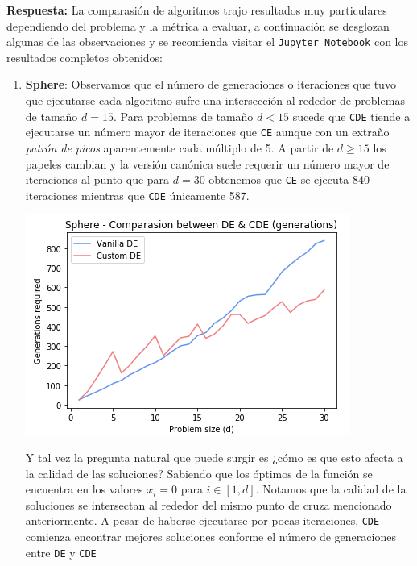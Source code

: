 \documentclass[10pt, letterpaper]{article}
\theoremstyle{definition}
\begin{document}
\begin{enumerate}
    \textbf{Respuesta:} La comparasión de algoritmos trajo resultados
    muy particulares dependiendo del problema y la métrica a evaluar, a
    continuación se desglozan algunas de las observaciones y se recomienda
    visitar el \texttt{Jupyter Notebook} con los resultados completos obtenidos:
    \begin{enumerate}
        \item \textbf{Sphere}: Observamos que el número de generaciones
               o iteraciones que tuvo que ejecutarse cada algoritmo sufre una
               intersección al rededor de problemas de tamaño $d=15$. Para
               problemas de tamaño $d<15$ sucede que \texttt{CDE} tiende a
               ejecutarse un número mayor de iteraciones que \texttt{CE} aunque
               con un extraño \textit{patrón de picos} aparentemente cada
               múltiplo de 5. A partir de $d\geq 15$ los papeles cambian y la
               versión canónica suele requerir un número mayor de iteraciones al
               punto que para $d=30$ obtenemos que \texttt{CE} se ejecuta 840
               iteraciones mientras que \texttt{CDE} únicamente 587.
            \begin{center}
                \includegraphics[scale=0.6]{assets/sphere-gens.png}
            \end{center}
            Y tal vez la pregunta natural que puede surgir es ¿cómo es que esto
            afecta a la calidad de las soluciones? Sabiendo que los óptimos
            de la función se encuentra en los valores $x_i=0$ para $i \in [1, d]$.
            Notamos que la calidad de la soluciones se intersectan al rededor del mismo
            punto de cruza mencionado anteriormente. A pesar de haberse ejecutarse por
            pocas iteraciones, \texttt{CDE} comienza encontrar mejores soluciones
            conforme el número de generaciones entre \texttt{DE} y \texttt{CDE}

\end{enumerate}
\end{enumerate}
\end{document}
